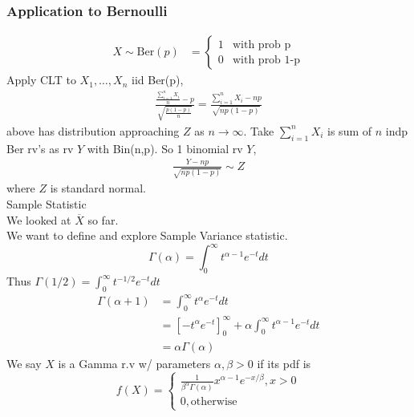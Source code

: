 \documentclass{article}
\begin{document}
\subsubsection*{Application to Bernoulli}
\begin{align*}
X\sim \text{Ber}(p) &= \begin{cases} 1 & \text{with prob p}\\
0 &\text{with prob 1-p}
\end{cases}
\end{align*}
Apply CLT to $X_1,\dots,X_n$ iid Ber(p),
\begin{align*}
\frac{\frac{\sum_{i=1}^nX_i}{n}-p}{\sqrt{\frac{p(1-p)}{n}}} = \frac{\sum_{i=1}^{n}X_i - np}{\sqrt{np(1-p)}}
\end{align*}
above has distribution approaching $Z$ as $n\rightarrow\infty$. Take $\sum_{i=1}^{n}X_i$ is sum of $n$ indp Ber rv's as rv $Y$ with Bin(n,p). So 1 binomial rv $Y$,
\begin{align*}
\frac{Y - np}{\sqrt{np(1-p)}} \sim Z
\end{align*}
where $Z$ is standard normal.\\
Sample Statistic \\
We looked at $\overline{X}$ so far.\\
We want to define and explore Sample Variance statistic.\\ 
$$\Gamma(\alpha) = \int_{0}^{\infty} t^{\alpha - 1} e^{-t} dt$$
Thus $\Gamma(1/2) = \int_{0}^{\infty} t^{-1/2} e^{-t} dt$\\
\begin{align*}
    \Gamma(\alpha + 1) &= \int_{0}^{\infty} t^{\alpha} e^{-t} dt\\
    &= \left[-t^{\alpha}e^{-t}\right]_{0}^{\infty} + \alpha \int_{0}^{\infty} t^{\alpha - 1} e^{-t} dt\\
    &= \alpha \Gamma(\alpha)
\end{align*}
We say $X$ is a Gamma r.v w/ parameters $\alpha, \beta > 0 $ if its pdf is
$$ f(X) = \begin{cases} 
    \frac{1}{\beta^{\alpha} \Gamma(\alpha)} x^{\alpha -1 } e^{-x/\beta}, x>0\\
    0, \text{otherwise}
\end{cases}$$
\end{document}
